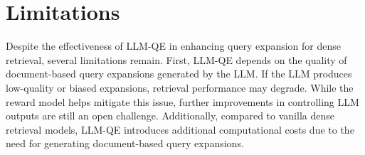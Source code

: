\section*{Limitations}
Despite the effectiveness of LLM-QE in enhancing query expansion for dense retrieval, several limitations remain. First, LLM-QE depends on the quality of document-based query expansions generated by the LLM. If the LLM produces low-quality or biased expansions, retrieval performance may degrade. While the reward model helps mitigate this issue, further improvements in controlling LLM outputs are still an open challenge. Additionally, compared to vanilla dense retrieval models, LLM-QE introduces additional computational costs due to the need for generating document-based query expansions.


